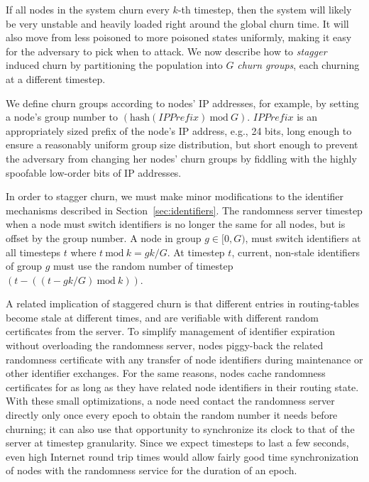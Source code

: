 \documentclass[10pt,twocolumn]{article}
\begin{document}
\label{sec:staggering}

If all nodes in the system churn every $k$-th timestep, then the system
will likely be very unstable and heavily loaded right around the global churn
time. It will also move from less poisoned to more poisoned
states uniformly, making it easy for the adversary to pick when to attack.
We now describe how to \emph{stagger} 
induced churn by partitioning the population into $G$
\emph{churn groups}, each churning at a different timestep.

We define churn groups according to nodes' IP addresses, for
example, by setting a node's group number to $(\mathrm{hash}(\mathit{IPPrefix})
\mathrm{\ mod\ } G)$.  $\mathit{IPPrefix}$ is an appropriately sized
prefix of the node's IP address, e.g., 24 bits, long enough to ensure a
reasonably uniform group size distribution, but short enough to prevent
the adversary from changing her nodes' churn groups by fiddling with the
highly spoofable low-order bits of IP addresses.

In order to stagger churn, we must make minor modifications to the
identifier mechanisms described in Section~\ref{sec:identifiers}.  The
randomness server timestep when a node must switch identifiers is no
longer the same for all nodes, but is offset by the group number.
A node in group $g \in [0, G)$, must switch identifiers at all timesteps $t$ where
$t \mathrm{\ mod\ } k = gk/G$.  At timestep $t$, current, non-stale
identifiers of group $g$ must use the random number of timestep $(t -
((t - gk/G) \mathrm{\ mod\ } k))$.

A related implication of staggered churn is that different entries in
routing-tables become stale at different times, and are verifiable
with different random certificates from the server.  To simplify
management of identifier expiration without overloading the randomness
server, nodes piggy-back the related randomness certificate with any
transfer of node identifiers during maintenance or other
identifier exchanges.  For the same reasons, nodes cache randomness certificates
for as long as they have related node identifiers in their routing
state.  With these small optimizations, a node need contact the
randomness server directly only once every epoch to obtain
the random number it needs before churning; it can also use
that opportunity to synchronize its clock to that of the server at
timestep granularity.  Since we expect timesteps to last a few
seconds, even high Internet round trip times would allow fairly good time
synchronization of nodes with the randomness service for the duration of
an epoch.
\end{document}
